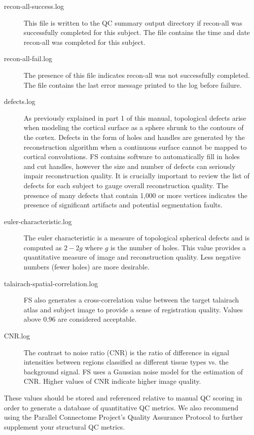 \documentclass[paper=a4, fontsize=11pt]{scrartcl} %
\numberwithin{equation}{section} %
\numberwithin{figure}{section} %
\numberwithin{table}{section} %
\begin{document}
\begin{description}
\item[recon-all-success.log] This file is written to the QC summary output directory if recon-all was successfully completed for this subject.  The file contains the time and date recon-all was completed for this subject.
\item[recon-all-fail.log] The presence of this file indicates recon-all was not successfully completed.  The file contains the last error message printed to the log before failure.
\item[defects.log] As previously explained in part 1 of this manual, topological defects arise when modeling the cortical surface as a sphere shrunk to the contours of the cortex. Defects in the form of holes and handles are generated by the reconstruction algorithm when a continuous surface cannot be mapped to cortical convolutions. FS contains software to automatically fill in holes and cut handles, however the size and number of defects can seriously impair reconstruction quality.  It is crucially important to review the list of defects for each subject to gauge overall reconstruction quality.  The presence of many defects that contain 1,000 or more vertices indicates the presence of significant artifacts and potential segmentation faults.
\item[euler-characteristic.log]  The euler characteristic is a measure of topological spherical defects and is computed as $2 - 2g$ where $g$ is the number of holes.  This value provides a quantitative measure of image and reconstruction quality.  Less negative numbers (fewer holes) are more desirable.
\item[talairach-spatial-correlation.log]  FS also generates a cross-correlation value between the target talairach atlas and subject image to provide a sense of registration quality.  Values above 0.96 are considered acceptable.
\item[CNR.log]  The contrast to noise ratio (CNR) is the ratio of difference in signal intensities between regions classified as different tissue types vs. the background signal.  FS uses a Gaussian noise model for the estimation of CNR.  Higher values of CNR indicate higher image quality.
\end{description}

These values should be stored and referenced relative to manual QC scoring in order to generate a database of quantitative QC metrics.  We also recommend using the Parallel Connectome Project's Quality Assurance Protocol to further supplement your structural QC metrics.
\end{document}
